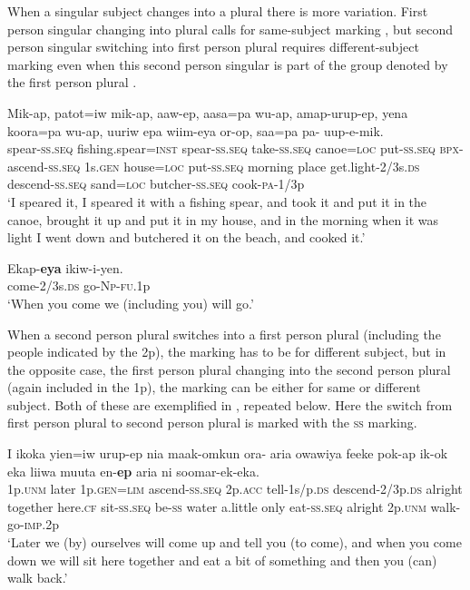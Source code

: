 When a singular subject changes into a plural there is more variation. First person singular changing into plural calls for same-subject marking , but second person singular switching into first person plural requires different-subject marking even when this second person singular is part of the group denoted by the first person plural . 

\ea%
\label{ex:8:x1435}
\gll Mik-ap,  patot=iw  mik-ap,  aaw-ep, aasa=pa  wu-ap,  amap-urup-ep,  yena  koora=pa wu-ap,  uuriw  epa  wiim-eya  or-op, saa=pa  pa-  uup-e-mik.\\
spear-\textsc{ss}.\textsc{seq} fishing.spear=\textsc{inst} spear-\textsc{ss}.\textsc{seq} take-\textsc{ss}.\textsc{seq} canoe=\textsc{loc} put-\textsc{ss}.\textsc{seq} \textsc{\textsc{bp}x}-ascend-\textsc{ss}.\textsc{seq} 1s.\textsc{gen} house=\textsc{loc} put-\textsc{ss}.\textsc{seq} morning place get.light-2/3s.\textsc{ds} descend-\textsc{ss}.\textsc{seq} sand=\textsc{loc} butcher-\textsc{ss}.\textsc{seq} cook-\textsc{pa}-1/3p\\
\glt`I speared it, I speared it with a fishing spear, and took it and put it in the canoe, brought it up and put it in my house, and in the morning when it was light I went down and butchered it on the beach, and  cooked it.'
\z


\ea%
\label{ex:8:x1439}
\gll Ekap-\textbf{eya} ikiw-i-yen.\\
come-2/3s.\textsc{ds} go-\textsc{Np}-\textsc{fu}.1p\\
\glt`When you come we (including you) will go.'
\z


When a second person plural switches into a first person plural (including the people indicated by the 2p), the marking has to be for different subject, but in the opposite case, the first person plural changing into the second person plural (again included in the 1p), the marking can be either for same or different subject. Both of these are exemplified in , repeated below. Here the switch from first person plural to second person plural is marked with the \textsc{ss} marking.

\ea
\label{ex:8:x248}
\gll I  ikoka  yien=iw  urup-ep  nia  maak-omkun ora-  aria  owawiya  feeke  pok-ap  ik-ok eka  liiwa  muuta  en-\textbf{ep}  aria  ni  soomar-ek-eka. \\
1p.\textsc{unm} later 1p.\textsc{gen}=\textsc{lim} ascend-\textsc{ss}.\textsc{seq} 2p.\textsc{acc} tell-1s/p.\textsc{ds} descend-2/3p.\textsc{ds} alright  together  here.\textsc{cf} sit-\textsc{ss}.\textsc{seq} be-\textsc{ss} water  a.little  only  eat-\textsc{ss}.\textsc{seq} alright 2p.\textsc{unm} walk-go-\textsc{imp}.2p\\
\glt `Later we (by) ourselves will come up and tell you (to come), and when you come down we will sit here together and eat a bit of something and then you (can) walk back.'
\z
{}

